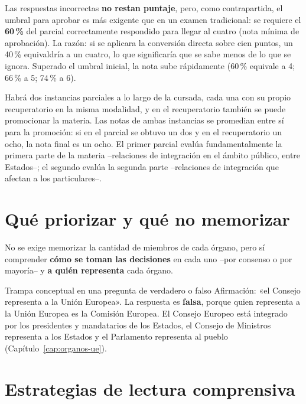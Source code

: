 \documentclass[12pt,oneside]{book}
\begin{document}
\begin{importante}
Las respuestas incorrectas \textbf{no restan puntaje}, pero, como contrapartida, el umbral para aprobar es más exigente que en un examen tradicional: se requiere el \textbf{60\,\%} del parcial correctamente respondido para llegar al cuatro (nota mínima de aprobación). La razón: si se aplicara la conversión directa sobre cien puntos, un 40\,\% equivaldría a un cuatro, lo que significaría que se sabe menos de lo que se ignora. Superado el umbral inicial, la nota sube rápidamente (60\,\% equivale a 4; 66\,\% a 5; 74\,\% a 6).
\end{importante}

Habrá dos instancias parciales a lo largo de la cursada, cada una con su propio recuperatorio en la misma modalidad, y en el recuperatorio también se puede promocionar la materia. Las notas de ambas instancias se promedian entre sí para la promoción: si en el parcial se obtuvo un dos y en el recuperatorio un ocho, la nota final es un ocho. El primer parcial evalúa fundamentalmente la primera parte de la materia --relaciones de integración en el ámbito público, entre Estados--; el segundo evalúa la segunda parte --relaciones de integración que afectan a los particulares--.

\section{Qué priorizar y qué no memorizar}

No se exige memorizar la cantidad de miembros de cada órgano, pero sí comprender \textbf{cómo se toman las decisiones} en cada uno --por consenso o por mayoría-- y \textbf{a quién representa} cada órgano.

\begin{ejemplo}{Trampa conceptual en una pregunta de verdadero o falso}
Afirmación: «el Consejo representa a la Unión Europea». La respuesta es \textbf{falsa}, porque quien representa a la Unión Europea es la Comisión Europea. El Consejo Europeo está integrado por los presidentes y mandatarios de los Estados, el Consejo de Ministros representa a los Estados y el Parlamento representa al pueblo (Capítulo~\ref{cap:organos-ue}).
\end{ejemplo}

\section{Estrategias de lectura comprensiva}
\end{document}
